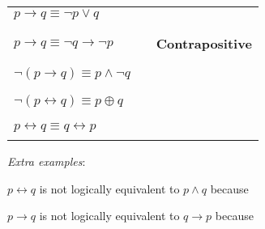 \documentclass[12pt, oneside]{article}
\begin{document}
\begin{tabular}{llp{3in}}
$p \to q \equiv \lnot p \lor q$ & & \\
&& \\
&& \\
$p \to q \equiv \lnot q \to \lnot p$ & &{\bf Contrapositive} \\
&& \\
&& \\
$\lnot (p \to q) \equiv p\land \lnot q$  & &\\
&& \\
&& \\
$\lnot( p \leftrightarrow q) \equiv p \oplus q$ && \\
&& \\
&& \\
$p \leftrightarrow q \equiv q \leftrightarrow p$ &&\\
&& \\
\end{tabular}

{\it Extra examples}:

$p \leftrightarrow q$ is not logically equivalent to $p \land q$ because \underline{\phantom{\hspace{4in}}} 

$p \to q$ is not logically equivalent to $q \to p$ because \underline{\phantom{\hspace{4in}}} 
 \newpage
\end{document}
